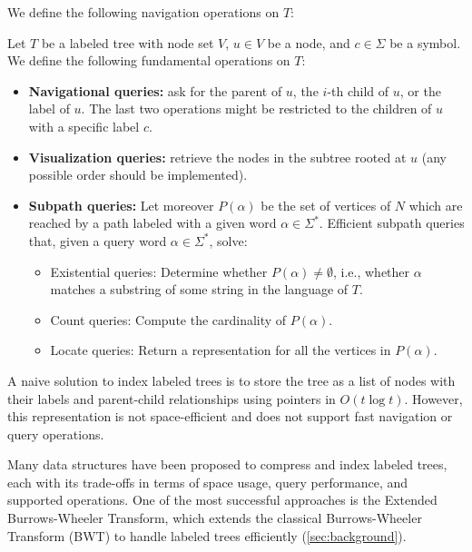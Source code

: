We define the following navigation operations on $T$:
\begin{definition} \label{def:tree_operations}
Let $T$ be a labeled tree with node set $V$, $u \in V$ be a node, and $c \in \Sigma$ be a symbol. We define the following fundamental operations on $T$:

\begin{itemize}
    \item \textbf{Navigational queries:} ask for the parent of $u$, the $i$-th child of $u$, or the label of $u$. The last two operations might be restricted to the children of $u$ with a specific label $c$.
    \item \textbf{Visualization queries:} retrieve the nodes in the subtree rooted at $u$ (any possible order should be implemented).
    \item \textbf{Subpath queries:} Let moreover $P(\alpha)$ be the set of vertices of $N$ which are reached by a path labeled with a given word $\alpha \in \Sigma^*$. Efficient subpath queries that, given a query word $\alpha \in \Sigma^*$, solve:
    \begin{itemize}
        \item Existential queries: Determine whether $P(\alpha) \neq \emptyset$, i.e., whether $\alpha$ matches a substring of some string in the language of $T$.
        \item Count queries: Compute the cardinality of $P(\alpha)$.
        \item Locate queries: Return a representation for all the vertices in $P(\alpha)$.
    \end{itemize}
\end{itemize}
\end{definition}

A naive solution to index labeled trees is to store the tree as a list of nodes with their labels and parent-child relationships using pointers in $O(t \log t)$. However, this representation is not space-efficient and does not support fast navigation or query operations. 

Many data structures have been proposed to compress and index labeled trees, each with its trade-offs in terms of space usage, query performance, and supported operations. One of the most successful approaches is the Extended Burrows-Wheeler Transform, which extends the classical Burrows-Wheeler Transform (BWT) to handle labeled trees efficiently (\cref{sec:background}).

